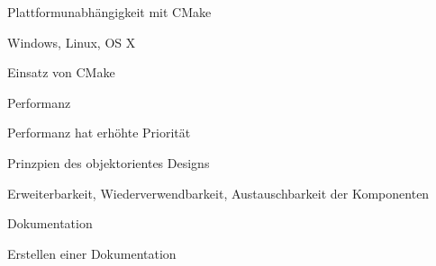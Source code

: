 \begin{compactenum}[a)]
	\item Plattformunabhängigkeit mit CMake
		\begin{compactenum}[1.]
			\item Windows, Linux, OS X
			\item Einsatz von CMake
		\end{compactenum}
		\item Performanz
		\begin{compactenum}[1.]
			\item Performanz hat erhöhte Priorität
		\end{compactenum}
		\item Prinzpien des objektorientes Designs
		\begin{compactenum}[1.]
			\item Erweiterbarkeit, Wiederverwendbarkeit, Austauschbarkeit der Komponenten
		\end{compactenum}
		\item Dokumentation
		\begin{compactenum}[1.]
			\item Erstellen einer Dokumentation
		\end{compactenum}
\end{compactenum}

